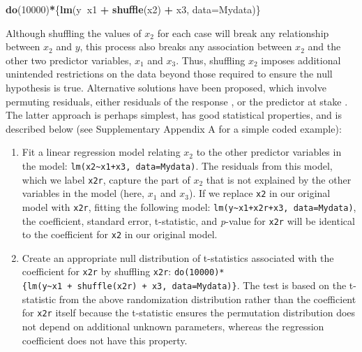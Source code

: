 \documentclass[fleqn,10pt]{wlpeerj} %
\newenvironment{Shaded}{\begin{snugshade}}{\end{snugshade}}
\newcommand{\DataTypeTok}[1]{\textcolor[rgb]{0.13,0.29,0.53}{#1}}
\newcommand{\DecValTok}[1]{\textcolor[rgb]{0.00,0.00,0.81}{#1}}
\newcommand{\KeywordTok}[1]{\textcolor[rgb]{0.13,0.29,0.53}{\textbf{#1}}}
\newcommand{\NormalTok}[1]{#1}
\newcommand{\OperatorTok}[1]{\textcolor[rgb]{0.81,0.36,0.00}{\textbf{#1}}}
\newcommand{\StringTok}[1]{\textcolor[rgb]{0.31,0.60,0.02}{#1}}
\begin{document}
\begin{Shaded}
\begin{Highlighting}[]
\KeywordTok{do}\NormalTok{(}\DecValTok{10000}\NormalTok{)}\OperatorTok{*}\NormalTok{\{}\KeywordTok{lm}\NormalTok{(y}\OperatorTok{~}\NormalTok{x1 }\OperatorTok{+}\StringTok{ }\KeywordTok{shuffle}\NormalTok{(x2) }\OperatorTok{+}\StringTok{ }\NormalTok{x3, }\DataTypeTok{data=}\NormalTok{Mydata)\}}
\end{Highlighting}
\end{Shaded}

Although shuffling the values of \(x_2\) for each case will break any relationship between \(x_2\) and \(y\), this process also breaks any association between \(x_2\) and the other two predictor variables, \(x_1\) and \(x_3\). Thus, shuffling \(x_2\) imposes additional unintended restrictions on the data beyond those required to ensure the null hypothesis is true. Alternative solutions have been proposed, which involve permuting residuals, either residuals of the response \citep{freedman1983nonstochastic, anderson2001permutation}, or the predictor at stake \citep{collins1987permutation, dekker2007sensitivity}. The latter approach is perhaps simplest, has good statistical properties, and is described below (see Supplementary Appendix A for a simple coded example):

\begin{enumerate}
\def\labelenumi{\arabic{enumi}.}
\item
  Fit a linear regression model relating \(x_2\) to the other predictor variables in the model: \texttt{lm(x2\textasciitilde{}x1+x3,\ data=Mydata)}. The residuals from this model, which we label \texttt{x2r}, capture the part of \(x_2\) that is not explained by the other variables in the model (here, \(x_1\) and \(x_3\)). If we replace \texttt{x2} in our original model with \texttt{x2r}, fitting the following model: \texttt{lm(y\textasciitilde{}x1+x2r+x3,\ data=Mydata)}, the coefficient, standard error, t-statistic, and \emph{p}-value for \texttt{x2r} will be identical to the coefficient for \texttt{x2} in our original model.
\item
  Create an appropriate null distribution of t-statistics associated with the coefficient for \texttt{x2r} by shuffling \texttt{x2r}: \texttt{do(10000)*\{lm(y\textasciitilde{}x1\ +\ shuffle(x2r)\ +\ x3,\ data=Mydata)\}}. The test is based on the t-statistic from the above randomization distribution rather than the coefficient for \texttt{x2r} itself because the t-statistic ensures the permutation distribution does not depend on additional unknown parameters, whereas the regression coefficient does not have this property.
\end{enumerate}
\end{document}

